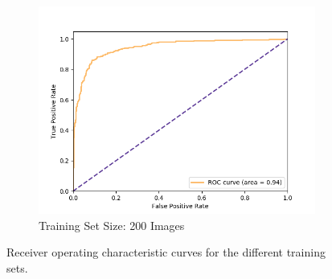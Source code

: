 \begin{figure}[ht]
\begin{subfigure}{.49\textwidth}
        \includegraphics[width=\textwidth]{images/score-100-roc.png}
        \caption{Training Set Size: 200 Images}
    \end{subfigure}
  
  \caption{Receiver operating characteristic curves for the different training sets.}
  \label{fig:whatever}
\end{figure}


